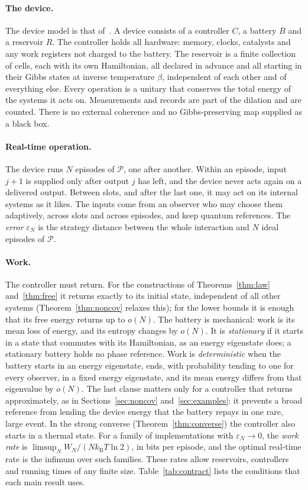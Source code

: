 \documentclass[11pt]{article}
\theoremstyle{definition}
\theoremstyle{remark}
\newcommand{\kB}{k_{\mathrm B}}
\newcommand{\Pp}{\mathcal P}
\begin{document}
\paragraph{The device.} The device model is that of~\cite[Sec.~2]{SaveWork}. A device consists of a controller $C$, a battery $B$ and a reservoir $R$. The controller holds all hardware: memory, clocks, catalysts and any work registers not charged to the battery. The reservoir is a finite collection of cells, each with its own Hamiltonian, all declared in advance and all starting in their Gibbs states at inverse temperature $\beta$, independent of each other and of everything else. Every operation is a unitary that conserves the total energy of the systems it acts on. Measurements and records are part of the dilation and are counted. There is no external coherence and no Gibbs-preserving map supplied as a black box.

\paragraph{Real-time operation.} The device runs $N$ episodes of $\Pp$, one after another. Within an episode, input $j+1$ is supplied only after output $j$ has left, and the device never acts again on a delivered output. Between slots, and after the last one, it may act on its internal systems as it likes. The inputs come from an observer who may choose them adaptively, across slots and across episodes, and keep quantum references. The \emph{error} $\varepsilon_N$ is the strategy distance between the whole interaction and $N$ ideal episodes of $\Pp$.

\paragraph{Work.} The controller must return. For the constructions of Theorems~\ref{thm:law} and~\ref{thm:free} it returns exactly to its initial state, independent of all other systems (Theorem~\ref{thm:noncov} relaxes this); for the lower bounds it is enough that its free energy returns up to $o(N)$. The battery is mechanical: work is its mean loss of energy, and its entropy changes by $o(N)$. It is \emph{stationary} if it starts in a state that commutes with its Hamiltonian, as an energy eigenstate does; a stationary battery holds no phase reference. Work is \emph{deterministic} when the battery starts in an energy eigenstate, ends, with probability tending to one for every observer, in a fixed energy eigenstate, and its mean energy differs from that eigenvalue by $o(N)$. The last clause matters only for a controller that returns approximately, as in Sections~\ref{sec:noncov} and~\ref{sec:examples}: it prevents a broad reference from lending the device energy that the battery repays in one rare, large event. In the strong converse (Theorem~\ref{thm:converse}) the controller also starts in a thermal state. For a family of implementations with $\varepsilon_N\to0$, the \emph{work rate} is $\limsup_NW_N/(N\kB T\ln2)$, in bits per episode, and the optimal real-time rate is the infimum over such families. These rates allow reservoirs, controllers and running times of any finite size. Table~\ref{tab:contract} lists the conditions that each main result uses.
\end{document}
